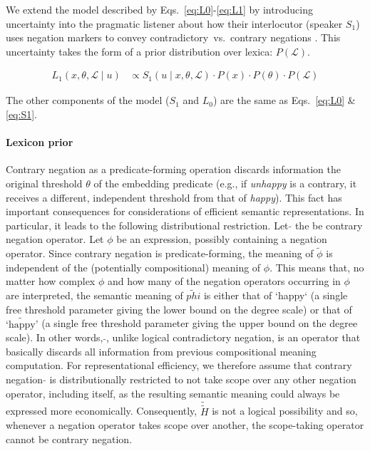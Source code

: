 \documentclass[floatsintext,doc]{apa6}
\let\oldparagraph\paragraph
\renewcommand{\paragraph}[1]{\oldparagraph{#1}\mbox{}}
\begin{document}
We extend the model described by Eqs.~\ref{eq:L0}-\ref{eq:L1} by introducing uncertainty into the pragmatic listener about how their interlocutor (speaker $S_1$) uses negation markers to convey contradictory~vs.~contrary negations \cite{Bergen2016}.
This uncertainty takes the form of a prior distribution over lexica: $P(\mathcal{L})$.

\begin{align}
L_{1}(x, \theta, \mathcal{L} \mid u) &\propto S_{1}(u \mid x, \theta, \mathcal{L}) \cdot P(x) \cdot  P(\theta) \cdot P(\mathcal{L}) \label{eq:L1a}
\end{align}

The other components of the model ($S_1$ and $L_0$) are the same as Eqs.~\ref{eq:L0} \& \ref{eq:S1}.

\paragraph{Lexicon prior}
%
Contrary negation as a predicate-forming operation discards information the original threshold $\theta$ of the embedding predicate (e.g., if \emph{unhappy} is a contrary, it receives a different, independent threshold from that of \emph{happy}).
This fact has important consequences for considerations of efficient semantic representations.
In particular, it leads to the following distributional restriction.
Let $\tilde{}$ the be contrary negation operator.
Let $\phi$ be an expression, possibly containing a negation operator. 
Since contrary negation is predicate-forming, the meaning of $\tilde{\phi}$ is independent of the (potentially compositional) meaning of $\phi$.
This means that, no matter how complex $\phi$ and how many of the negation operators occurring in $\phi$ are interpreted, the semantic meaning of $\tilde{phi}$ is either that of `happy` (a single free threshold parameter giving the lower bound on the degree scale) or that of $\tilde{\textrm{`happy'}}$ (a single free threshold parameter giving the upper bound on the degree scale).
In other words, $\tilde{}$, unlike logical contradictory negation, is an operator that basically discards all information from previous compositional meaning computation.
For representational efficiency, we therefore assume that contrary negation $\tilde{}$ is distributionally restricted to not take scope over any other negation operator, including itself, as the resulting semantic meaning could always be expressed more economically. 
Consequently, $\tilde{\tilde{H}}$ is not a logical possibility \cite{Horn1989:Natural} and so, whenever a negation operator takes scope over another, the scope-taking operator cannot be contrary negation.
\end{document}
